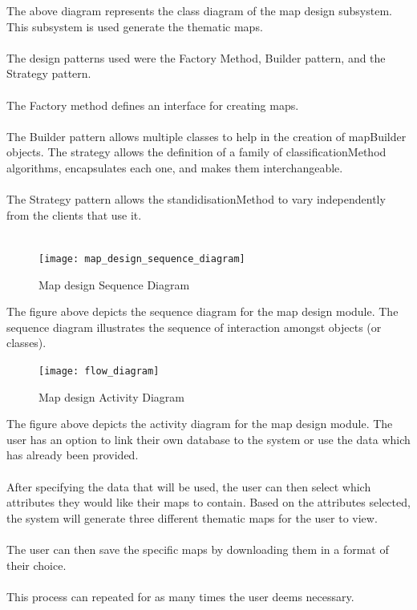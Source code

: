 \documentclass{article}
\begin{document}
The above diagram represents the class diagram of the map design subsystem. This subsystem is used generate the thematic maps.
\\\\
The design patterns used were the Factory Method, Builder pattern, and the Strategy pattern.
\\\\
The Factory method defines an interface for creating maps.
\\\\
The Builder pattern allows multiple classes to help in the creation of mapBuilder objects. The strategy allows the definition of a family of classificationMethod algorithms, encapsulates each one, and makes them interchangeable. 
\\\\
The Strategy pattern allows the standidisationMethod to vary independently from the clients that use it.
\\\\            
            
         \begin{figure}[h!]
        \texttt{[image: map\_design\_sequence\_diagram]}
        	\caption{Map design Sequence Diagram}
            \end{figure}
The figure above depicts the sequence diagram for the map design module. The sequence diagram illustrates the sequence of interaction amongst objects (or classes).
                       \newpage
            \begin{figure}[h!]
	\centering
	\texttt{[image: flow\_diagram]}
	\caption{Map design Activity Diagram}
\end{figure}

The figure above depicts the activity diagram for the map design module. The user has an option to link their own database to the system or use the data which has already been provided.
\\\\
After specifying the data that will be used, the user can then select which attributes they would like their maps to contain. Based on the attributes selected, the system will generate three different thematic maps for the user to view.
\\\\
The user can then save the specific maps by downloading them in a format of their choice.
\\\\
This process can repeated for as many times the user deems necessary.
              
\end{document}
